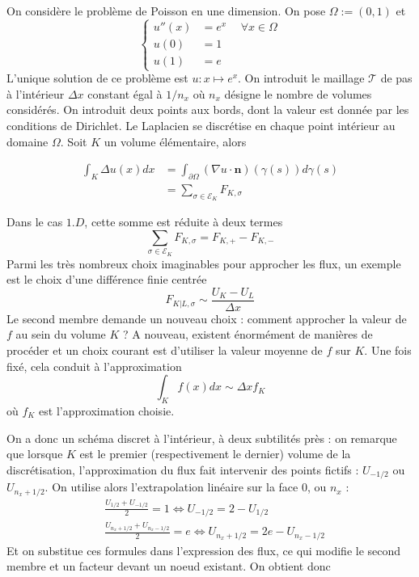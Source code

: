 On considère le problème de Poisson en une dimension. On pose $\Omega := (0,1)$ et
\begin{equation*}
\left\{\begin{array}{rl}
    u''(x) & = e^x \hspace{15pt} \forall x \in \Omega \\
    u(0) & = 1 \\
    u(1) & = e
\end{array}
\right.
\end{equation*}
L'unique solution de ce problème est $u : x \mapsto e^x$. On introduit le maillage $\mathcal{T}$ de pas à l'intérieur $\Delta x$ constant égal à $1/n_x$ où $n_x$ désigne le nombre de volumes considérés. On introduit deux points aux bords, dont la valeur est donnée par les conditions de Dirichlet. Le Laplacien se discrétise en chaque point intérieur au domaine $\Omega$. Soit $K$ un volume élémentaire, alors

\begin{align*}
    \int_K \Delta u(x) dx & = \int_{\partial \Omega} (\nabla u \cdot \mathbf{n})(\gamma(s)) d\gamma(s) \\
                          & = \sum_{\sigma \in \mathcal{E}_K} F_{K,\sigma}
\end{align*}

Dans le cas $1.D$, cette somme est réduite à deux termes $$ \sum_{\sigma \in \mathcal{E}_K} F_{K,\sigma} = F_{K, +} - F_{K, -} $$ Parmi les très nombreux choix imaginables pour approcher les flux, un exemple est le choix d'une différence finie centrée $$ F_{K|L, \sigma} \sim \frac{U_{K} - U_{L}}{\Delta x} $$ Le second membre demande un nouveau choix : comment approcher la valeur de $f$ au sein du volume $K$ ? A nouveau, existent énormément de manières de procéder et un choix courant est d'utiliser la valeur moyenne de $f$ sur $K$. Une fois fixé, cela conduit à l'approximation $$ \int_K f(x) dx \sim \Delta x f_K $$ où $f_K$ est l'approximation choisie. 

On a donc un schéma discret à l'intérieur, à deux subtilités près : on remarque que lorsque $K$ est le premier (respectivement le dernier) volume de la discrétisation, l'approximation du flux fait intervenir des points fictifs : $U_{-1/2}$ ou $U_{n_x+1/2}$. On utilise alors l'extrapolation linéaire sur la face $0$, ou $n_x$ :
\begin{align*}
    & \frac{U_{1/2} + U_{-1/2}}{2} = 1 \Longleftrightarrow U_{-1/2} = 2 - U_{1/2} \\
    & \frac{U_{n_x+1/2} + U_{n_x-1/2}}{2} = e \Longleftrightarrow U_{n_x+1/2} = 2e - U_{n_x-1/2}
\end{align*}
Et on substitue ces formules dans l'expression des flux, ce qui modifie le second membre et un facteur devant un noeud existant. On obtient donc

